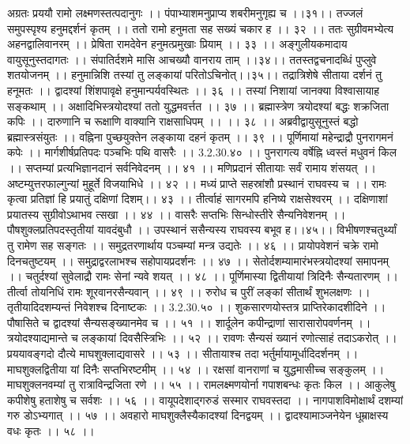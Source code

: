 अग्रतः प्रययौ रामो लक्ष्मणस्तत्पदानुगः ।।
पंपाभ्याशमनुप्राप्य शबरीमनुगृह्य च ।।३१।।
तज्जलं समुपस्पृश्य हनुमद्दर्शनं कृतम् ।।
ततो रामो हनुमता सह सख्यं चकार ह ।। ३२ ।।
ततः सुग्रीवमभ्येत्य अहनद्वालिवानरम् ।।
प्रेषिता रामदेवेन हनुमत्प्रमुखाः प्रियाम् ।। ३३ ।।
अङ्गुलीयकमादाय वायुसूनुस्तदागतः ।।
संपातिर्दशमे मासि आचख्यौ वानराय ताम् ।।३४।।
ततस्तद्वचनादब्धिं पुप्लुवे शतयोजनम् ।।
हनुमान्निशि तस्यां तु लङ्कायां परितोऽचिनोत्।।३५।।
तद्रात्रिशेषे सीताया दर्शनं तु हनूमतः ।।
द्वादश्यां शिंशपावृक्षे हनुमान्पर्यवस्थितः ।। ३६ ।।
तस्यां निशायां जानक्या विश्वासायाह सङ्कथाम् ।।
अक्षादिभिस्त्रयोदश्यां ततो युद्धमवर्त्तत ।। ३७ ।।
ब्रह्मास्त्रेण त्रयोदश्यां बद्धः शक्रजिता कपिः ।।
दारुणानि च रूक्षाणि वाक्यानि राक्षसाधिपम् ।। ।। ३८ ।।
अब्रवीद्वायुसूनुस्तं बद्धो ब्रह्मास्त्रसंयुतः ।।
वह्निना पुच्छयुक्तेन लङ्काया दहनं कृतम् ।। ३९ ।।
पूर्णिमायां महेन्द्राद्रौ पुनरागमनं कपेः ।।
मार्गशीर्षप्रतिपदः पञ्चभिः पथि वासरैः ।। 3.2.30.४० ।।
पुनरागत्य वर्षेह्नि ध्वस्तं मधुवनं किल ।।
सप्तम्यां प्रत्यभिज्ञानदानं सर्वनिवेदनम् ।। ४१ ।।
मणिप्रदानं सीतायाः सर्वं रामाय शंसयत् ।।
अष्टम्युत्तरफाल्गुन्यां मुहूर्ते विजयाभिधे ।। ४२ ।।
मध्यं प्राप्ते सहस्रांशौ प्रस्थानं राघवस्य च ।।
रामः कृत्वा प्रतिज्ञां हि प्रयातुं दक्षिणां दिशम्।। ४३ ।।
तीर्त्वाहं सागरमपि हनिष्ये राक्षसेश्वरम् ।।
दक्षिणाशां प्रयातस्य सुग्रीवोऽथाभव त्सखा ।। ४४ ।।
वासरैः सप्तभिः सिन्धोस्तीरे सैन्यनिवेशनम् ।।
पौषशुक्लप्रतिपदस्तृतीयां यावदंबुधौ ।।
उपस्थानं ससैन्यस्य राघवस्य बभूव ह।।४५।।
विभीषणश्चतुर्थ्यां तु रामेण सह सङ्गतः ।।
समुद्रतरणार्थाय पञ्चम्यां मन्त्र उद्यतेः ।। ४६ ।।
प्रायोपवेशनं चक्रे रामो दिनचतुष्टयम् ।।
समुद्राद्वरलाभश्च सहोपायप्रदर्शनः ।। ४७ ।।
सेतोर्दशम्यामारंभस्त्रयोदश्यां समापनम् ।।
चतुर्दश्यां सुवेलाद्रौ रामः सेनां न्यवे शयत् ।। ४८ ।।
पूर्णिमास्या द्वितीयायां त्रिदिनैः सैन्यतारणम् ।।
तीर्त्वा तोयनिधिं रामः शूरवानरसैन्यवान् ।। ४९ ।।
रुरोध च पुरीं लङ्कां सीतार्थं शुभलक्षणः ।।
तृतीयादिदशम्यन्तं निवेशश्च दिनाष्टकः ।। 3.2.30.५० ।।
शुकसारणयोस्तत्र प्राप्तिरेकादशीदिने ।।
पौषासिते च द्वादश्यां सैन्यसङ्ख्यानमेव च ।। ५१ ।।
शार्दूलेन कपीन्द्राणां सारासारोपवर्णनम् ।।
त्रयोदश्याद्यमान्ते च लङ्कायां दिवसैस्त्रिभिः ।। ५२ ।।
रावणः सैन्यसं ख्यानं रणोत्साहं तदाऽकरोत् ।।
प्रययावङ्गदो दौत्ये माघशुक्लाद्यवासरे ।। ५३ ।।
सीतायाश्च तदा भर्तुर्मायामूर्धादिदर्शनम् ।।
माघशुक्लद्वितीया यां दिनैः सप्तभिरष्टमीम् ।। ५४ ।।
रक्षसां वानराणां च युद्धमासीच्च सङ्कुलम् ।।
माघशुक्लनवम्यां तु रात्राविन्द्रजिता रणे ।। ५५ ।।
रामलक्ष्मणयोर्ना गपाशबन्धः कृतः किल ।।
आकुलेषु कपीशेषु हताशेषु च सर्वशः ।। ५६ ।।
वायूपदेशाद्गरुडं सस्मार राघवस्तदा ।।
नागपाशविमोक्षार्थं दशम्यां गरु डोऽभ्यगात् ।। ५७ ।।
अवहारो माघशुक्लैस्यैकादश्यां दिनद्वयम् ।।
द्वादश्यामाञ्जनेयेन धूम्राक्षस्य वधः कृतः ।। ५८ ।।
